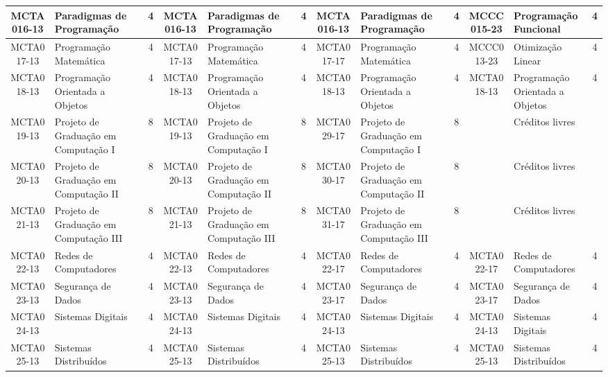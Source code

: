 \documentclass[a4paper]{article}
\begin{document}
\begin{landscape}
{\begin{longtable}{|c|p{.2\textheight}|c||c|p{.2\textheight}|c||c|p{.2\textheight}|c||c|p{.2\textheight}|c|}
    MCTA016-13 & Paradigmas de Programação & 4 &
    MCTA016-13 & Paradigmas de Programação & 4 & 
    MCTA016-13 & Paradigmas de Programação & 4 &
    MCCC015-23 & Programação Funcional & 4 \\ \hline

    MCTA017-13 & Programação Matemática & 4 &
    MCTA017-13 & Programação Matemática & 4 &
    MCTA017-17 & Programação Matemática & 4 &
    MCCC013-23 & Otimização Linear & 4 \\ \hline

    MCTA018-13 & Programação Orientada a Objetos & 4 &
    MCTA018-13 & Programação Orientada a Objetos & 4 & 
    MCTA018-13 & Programação Orientada a Objetos & 4 &
    MCTA018-13 & Programação Orientada a Objetos & 4 \\ \hline

    MCTA019-13 & Projeto de Graduação em Computação I & 8 &
    MCTA019-13 & Projeto de Graduação em Computação I & 8 &
    MCTA029-17 & Projeto de Graduação em Computação I & 8 &
               & Créditos livres &  \\ \hline

    MCTA020-13 & Projeto de Graduação em Computação II & 8 &
    MCTA020-13 & Projeto de Graduação em Computação II & 8 &
    MCTA030-17 & Projeto de Graduação em Computação II & 8 & 
               & Créditos livres &  \\ \hline

    MCTA021-13 & Projeto de Graduação em Computação III & 8 &
    MCTA021-13 & Projeto de Graduação em Computação III & 8 & 
    MCTA031-17 & Projeto de Graduação em Computação III & 8 &
               & Créditos livres &  \\ \hline

    MCTA022-13 & Redes de Computadores & 4 & 
    MCTA022-13 & Redes de Computadores & 4 &
    MCTA022-17 & Redes de Computadores & 4 & 
    MCTA022-17 & Redes de Computadores & 4 \\ \hline

    MCTA023-13 & Segurança de Dados & 4 & 
    MCTA023-13 & Segurança de Dados & 4 & 
    MCTA023-17 & Segurança de Dados & 4 & 
    MCTA023-17 & Segurança de Dados & 4 \\ \hline

    MCTA024-13 & Sistemas Digitais & 4 &
    MCTA024-13 & Sistemas Digitais & 4 &
    MCTA024-13 & Sistemas Digitais & 4 &
    MCTA024-13 & Sistemas Digitais & 4 \\ \hline

    MCTA025-13 & Sistemas Distribuídos & 4 &
    MCTA025-13 & Sistemas Distribuídos & 4 & 
    MCTA025-13 & Sistemas Distribuídos & 4 & 
    MCTA025-13 & Sistemas Distribuídos & 4 \\ \hline


\end{longtable}}
\end{landscape}
\end{document}
